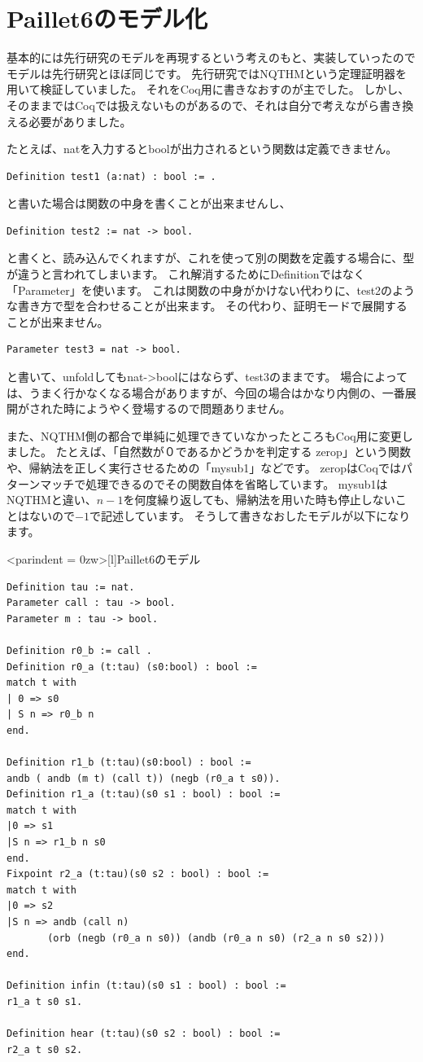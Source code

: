 \documentclass{jsbook}
\begin{document}
\section{Paillet6のモデル化}
基本的には先行研究のモデルを再現するという考えのもと、実装していったのでモデルは先行研究とほぼ同じです。
先行研究ではNQTHMという定理証明器を用いて検証していました。
それをCoq用に書きなおすのが主でした。
しかし、そのままではCoqでは扱えないものがあるので、それは自分で考えながら書き換える必要がありました。

たとえば、natを入力するとboolが出力されるという関数は定義できません。
\begin{verbatim}
Definition test1 (a:nat) : bool := .
\end{verbatim}
と書いた場合は関数の中身を書くことが出来ませんし、
\begin{verbatim}
Definition test2 := nat -> bool.
\end{verbatim}
と書くと、読み込んでくれますが、これを使って別の関数を定義する場合に、型が違うと言われてしまいます。
これ解消するためにDefinitionではなく「Parameter」を使います。
これは関数の中身がかけない代わりに、test2のような書き方で型を合わせることが出来ます。
その代わり、証明モードで展開することが出来ません。
\begin{verbatim}
Parameter test3 = nat -> bool.
\end{verbatim}
と書いて、unfoldしてもnat->boolにはならず、test3のままです。
場合によっては、うまく行かなくなる場合がありますが、今回の場合はかなり内側の、一番展開がされた時にようやく登場するので問題ありません。

また、NQTHM側の都合で単純に処理できていなかったところもCoq用に変更しました。
たとえば、「自然数が０であるかどうかを判定する zerop」という関数や、帰納法を正しく実行させるための「mysub1」などです。
zeropはCoqではパターンマッチで処理できるのでその関数自体を省略しています。
mysub1はNQTHMと違い、$n - 1$を何度繰り返しても、帰納法を用いた時も停止しないことはないので$-1$で記述しています。
そうして書きなおしたモデルが以下になります。

\begin{breakitembox}<parindent = 0zw>[l]{Paillet6のモデル}
  \begin{verbatim}
Definition tau := nat.
Parameter call : tau -> bool.
Parameter m : tau -> bool.

Definition r0_b := call .
Definition r0_a (t:tau) (s0:bool) : bool :=
match t with
| 0 => s0
| S n => r0_b n
end.

Definition r1_b (t:tau)(s0:bool) : bool :=
andb ( andb (m t) (call t)) (negb (r0_a t s0)).
Definition r1_a (t:tau)(s0 s1 : bool) : bool :=
match t with
|0 => s1
|S n => r1_b n s0
end.
Fixpoint r2_a (t:tau)(s0 s2 : bool) : bool :=
match t with
|0 => s2
|S n => andb (call n) 
       (orb (negb (r0_a n s0)) (andb (r0_a n s0) (r2_a n s0 s2)))
end.

Definition infin (t:tau)(s0 s1 : bool) : bool :=
r1_a t s0 s1.

Definition hear (t:tau)(s0 s2 : bool) : bool :=
r2_a t s0 s2.
  \end{verbatim}
\end{breakitembox}
\end{document}

